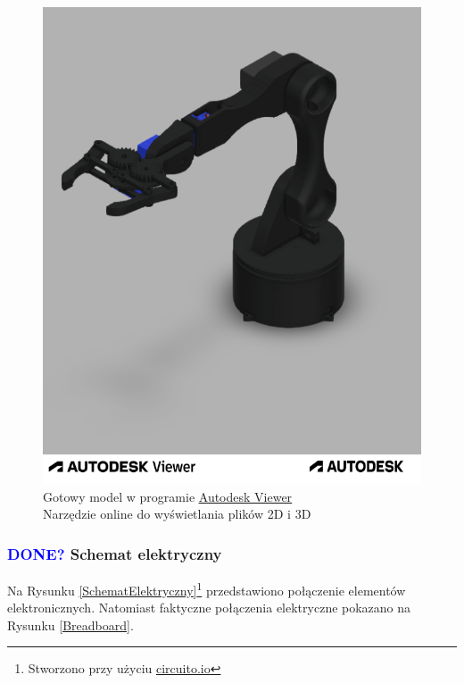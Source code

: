\documentclass[11pt,titlepage,a4paper]{article}
\begin{document}
\begin{figure}[p]
    \vspace{1cm}
    \begin{center}
        \includegraphics[width=\textwidth]{img/Robak v25.f3d.png}
    \end{center}
    \caption{
        Gotowy model w programie
        \href{https://viewer.autodesk.com/}
        {\underline{Autodesk Viewer}} \\ Narzędzie online do wyświetlania plików 2D i 3D}
    \label{AutodeskViewer}
\end{figure}

\newpage

\subsubsection{\textcolor{blue}{DONE?} Schemat elektryczny}

Na Rysunku \ref{SchematElektryczny}\footnote{Stworzono przy użyciu \href{https://www.circuito.io}{\underline{circuito.io}}} przedstawiono połączenie elementów elektronicznych. Natomiast faktyczne połączenia elektryczne pokazano na Rysunku \ref{Breadboard}.
\end{document}
